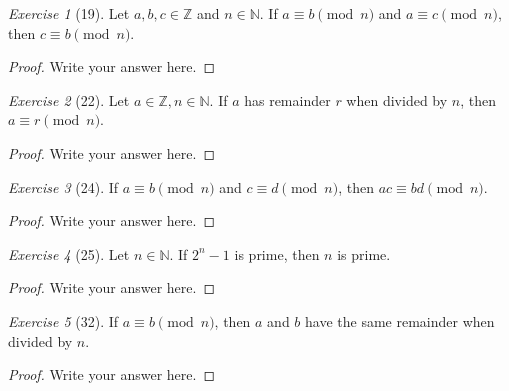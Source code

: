 \documentclass[12pt]{amsart}
\theoremstyle{remark}
\newtheorem*{exercise}{Exercise}%
\def\NN{\ensuremath{\mathbb N}}
\def\ZZ{\ensuremath{\mathbb Z}}
\theoremstyle{mycomment}
\begin{document}
\begin{exercise}[19] Let $a,b,c\in\ZZ$ and $n\in\NN$. If $a\equiv b\pmod n$ and $a\equiv c\pmod n$, then $c\equiv b\pmod n$.
\begin{proof}
Write your answer here.
\end{proof}
\end{exercise}

\begin{exercise}[22] Let $a\in\ZZ, n\in\NN$. If $a$ has remainder $r$ when divided by $n$, then $a\equiv r\pmod n$.
\begin{proof}
Write your answer here.
\end{proof}
\end{exercise}

\begin{exercise}[24] If $a\equiv b\pmod n$ and $c\equiv d\pmod n$, then $ac\equiv bd\pmod n$.
\begin{proof}
Write your answer here.
\end{proof}
\end{exercise}


\begin{exercise}[25] Let $n\in\NN$. If $2^{n}-1$ is prime, then $n$ is prime.
\begin{proof}
Write your answer here.
\end{proof}
\end{exercise}

\begin{exercise}[32] If $a\equiv b\pmod n$, then $a$ and $b$ have the same remainder when divided by $n$.
\begin{proof}
Write your answer here.
\end{proof}
\end{exercise}





 
\end{document}
